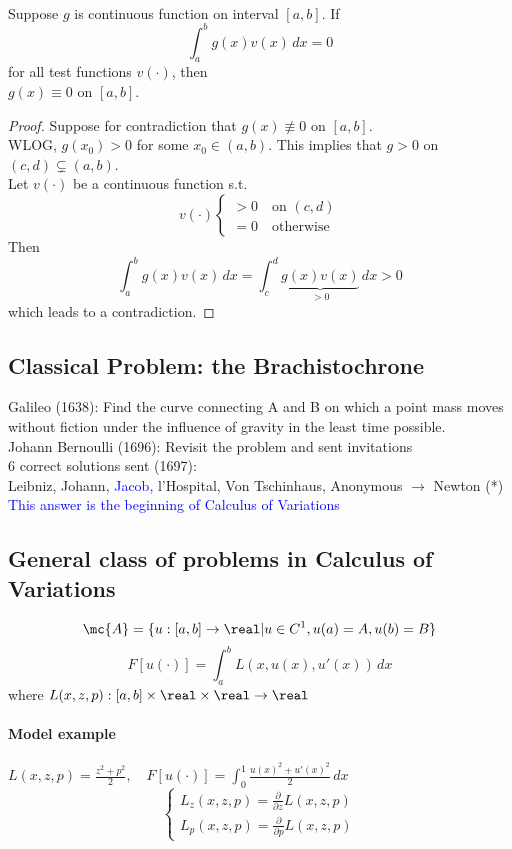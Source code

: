 \documentclass[11pt]{article}
\begin{document}
\paragraph{}
Suppose $g$ is continuous function on interval $[a,b]$. If
$$\int_a^b g(x)v(x) \, dx = 0$$ for all test functions $v(\cdot)$, then \\
$g(x) \equiv 0$ on $[a,b]$.\\
\begin{proof}
	Suppose for contradiction that $g(x) \not\equiv 0$ on $[a, b]$. \\
	WLOG, $g(x_0) > 0$ for some $x_0 \in (a,b)$. This implies that $g > 0$ on $(c, d) \subsetneq (a,b)$. \\
	Let $v(\cdot)$ be a continuous function s.t. 
	$$ v(\cdot) \begin{cases}
		> 0 \quad \text{on $(c,d)$} \\
		= 0 \quad \text{otherwise}
	\end{cases}$$
	Then
	$$\int_a^b g(x)v(x)\, dx = \int_c^d \underbrace{g(x) v(x)}_{>0} \, dx >0$$ which leads to a contradiction.
\end{proof}

\subsection{Classical Problem: the Brachistochrone}
Galileo (1638): Find the curve connecting A and B on which a point mass moves without fiction under the influence of gravity in the least time possible.\\
Johann Bernoulli (1696): Revisit the problem and sent invitations \\
6 correct solutions sent (1697): \\
Leibniz, Johann, \textcolor{blue}{Jacob}, l'Hospital, Von Tschinhaus, Anonymous $\rightarrow$ Newton (*)\\
\textcolor{blue}{This answer is the beginning of Calculus of Variations}


\subsection{General class of problems in Calculus of Variations}
$$\mc{A} = \{ u: [a,b] \rightarrow \real | u \in C^1, u(a) = A, u(b) = B\}$$
$$F[u(\cdot)] = \int_a^b L(x,u(x),u'(x))\,dx$$ 
where $L(x,z,p):[a,b] \times \real \times \real \rightarrow \real$

\paragraph{Model example}
$L(x, z, p) = \frac{z^2 + p^2}{2}, \quad F[u(\cdot)] = \int_0^1 \frac{u(x)^2 + u'(x)^2}{2} \, dx$\\
$$\begin{cases}
	L_z (x,z,p) = \frac{\partial}{\partial z} L(x,z,p) \\
	L_p (x,z,p) = \frac{\partial}{\partial p} L(x,z,p)
\end{cases}$$
\end{document}
